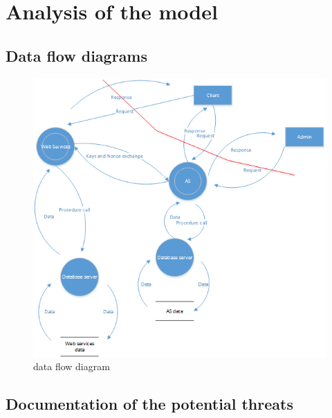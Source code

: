 \newpage
\section{Analysis of the model}
\subsection{Data flow diagrams}
\begin{figure}[H]
	\center
    \includegraphics[scale=0.9]{DataFlowDiagram.png}
    \caption{data flow diagram}
    \label{DataFlowDiagram}
\end{figure}

\subsection{Documentation of the potential threats}

